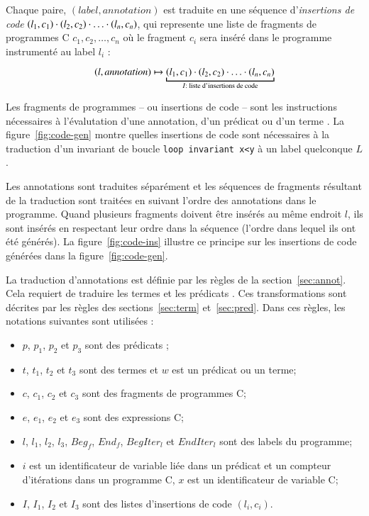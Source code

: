 Chaque paire, $(label, annotation)$ est traduite en une séquence
d'\emph{insertions de code}
$(l_1, c_1) \cdot (l_2, c_2) \cdot \ldots \cdot (l_n, c_n)$, qui 
represente une liste de fragments de programmes C $c_1, c_2, \ldots, c_n$ où
le fragment $c_i$ sera inséré dans le programme instrumenté au label $l_i$ :

\[
(l, annotation) \rulearrow \underbracket{(l_1, c_1) \concat (l_2, c_2) \concat
  \ldots \concat (l_n, c_n)}_{I : \text{ liste d'insertions de code}}
\]



Les fragments de programmes -- ou insertions de code -- sont les instructions
nécessaires à l'évalutation d'une annotation, d'un prédicat ou d'un terme
\eacsl.
La figure~\ref{fig:code-gen} montre quelles insertions de code sont nécessaires
à la traduction d'un invariant de boucle \lstinline'loop invariant x<y' à un
label quelconque $L$.



Les annotations \eacsl sont traduites séparément et les séquences de fragments
résultant de la traduction sont traitées en suivant l'ordre des annotations dans
le programme.
Quand plusieurs fragments doivent être insérés au même endroit $l$, ils sont
insérés en respectant leur ordre dans la séquence (l'ordre dans lequel ils ont
été générés).
La figure~\ref{fig:code-ins} illustre ce principe sur les insertions de code
générées dans la figure~\ref{fig:code-gen}.

La traduction d'annotations est définie par les règles de la
section~\ref{sec:annot}.
Cela requiert de traduire les termes et les prédicats \eacsl.
Ces transformations sont décrites par les règles des sections~\ref{sec:term}
et~\ref{sec:pred}.
Dans ces règles, les notations suivantes sont utilisées :
\begin{itemize}
\item $p$, $p_1$, $p_2$ et $p_3$ sont des prédicats \eacsl;
\item $t$, $t_1$, $t_2$ et $t_3$ sont des termes \eacsl et $w$ est un prédicat
  ou un terme;
\item $c$, $c_1$, $c_2$ et $c_3$ sont des fragments de programmes C;
\item $e$, $e_1$, $e_2$ et $e_3$ sont des expressions C;
\item $l$, $l_1$, $l_2$, $l_3$, $Beg_f$, $End_f$, $BegIter_l$ et $EndIter_l$ sont
  des labels du programme;
\item $i$ est un identificateur de variable liée dans un prédicat \eacsl et un
  compteur d'itérations dans un programme C, $x$ est un identificateur de
  variable C;
\item $I$, $I_1$, $I_2$ et $I_3$ sont des listes d'insertions de code
  $(l_i, c_i)$.
\end{itemize}

